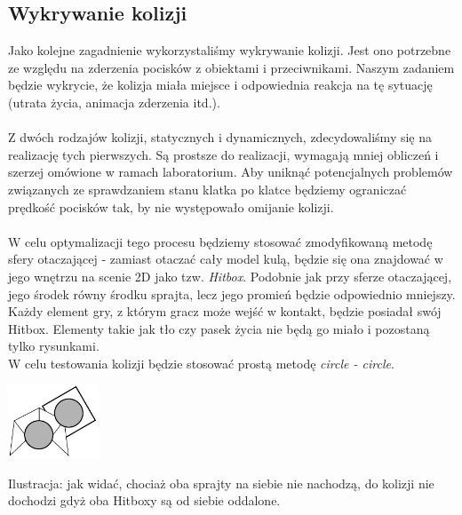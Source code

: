 \newpage
\subsection{Wykrywanie kolizji}
	\indent \indent Jako kolejne zagadnienie wykorzystaliśmy wykrywanie kolizji. Jest ono potrzebne ze względu na zderzenia pocisków z obiektami i przeciwnikami. Naszym zadaniem będzie wykrycie, że kolizja miała miejsce i odpowiednia reakcja na tę sytuację (utrata życia, animacja zderzenia itd.).\\\\
	\indent Z dwóch rodzajów kolizji, statycznych i dynamicznych, zdecydowaliśmy się na realizację tych pierwszych. Są prostsze do realizacji, wymagają mniej obliczeń i szerzej omówione w ramach laboratorium. Aby uniknąć potencjalnych problemów związanych ze sprawdzaniem stanu klatka po klatce będziemy ograniczać prędkość pocisków tak, by nie występowało omijanie kolizji.\\\\
	\indent W celu optymalizacji tego procesu będziemy stosować zmodyfikowaną metodę sfery otaczającej - zamiast otaczać cały model kulą, będzie się ona znajdować w jego wnętrzu na scenie 2D jako tzw. \emph{Hitbox}. Podobnie jak przy sferze otaczającej, jego środek równy środku sprajta, lecz jego promień będzie odpowiednio mniejszy. Każdy element gry, z którym gracz może wejść w kontakt, będzie posiadał swój Hitbox. Elementy takie jak tło czy pasek życia nie będą go miało i pozostaną tylko rysunkami.\\
	W celu testowania kolizji będzie stosować prostą metodę \emph{circle - circle}.
	\begin{center}
		\includegraphics[width=0.2\textwidth]{./images/kolizja}
	\end{center}
	Ilustracja: jak widać, chociaż oba sprajty na siebie nie nachodzą, do kolizji nie dochodzi gdyż oba Hitboxy są od siebie oddalone.
